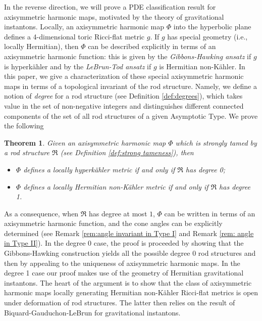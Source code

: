 \documentclass[a4paper,11pt]{amsart}
\newtheorem{theorem}{Theorem}[section]
\theoremstyle{definition}
\numberwithin{equation}{section}
\newcommand{\mR} {\mathfrak R}
\begin{document}
In the reverse direction, we will prove a PDE classification result for axisymmetric harmonic maps, motivated by the theory of gravitational instantons.     
 Locally, an axisymmetric harmonic map $\Phi$ into the hyperbolic plane defines a 4-dimensional toric Ricci-flat metric $g$. If $g$ has special geometry (i.e., locally Hermitian), then $\Phi$ can be  described explicitly in terms of an axisymmetric harmonic function: this is given by the \emph{Gibbons-Hawking ansatz} if $g$ is hyperk\"ahler and by the \emph{LeBrun-Tod ansatz} if $g$ is Hermitian non-K\"ahler. In this paper, we give a characterization of these special axisymmetric harmonic maps in terms of a topological invariant of the rod structure. Namely, we define a notion of \emph{degree} for a rod structure (see Definition \ref{def:degrees}), which takes value in the set of non-negative integers and distinguishes different connected components of the set of all rod structures of a given  Asymptotic Type. We prove the following
\begin{theorem}\label{t:main2}
    Given an axisymmetric harmonic map $\Phi$  which is strongly tamed by a rod structure $\mR$ (see  Definition \ref{def:strong tameness}), then 
    \begin{itemize}
        \item $\Phi$ defines a locally hyperk\"ahler metric if and only if $\mR$ has degree 0;
        \item $\Phi$ defines a locally Hermitian non-K\"ahler metric if and only if $\mR$ has degree 1.
    \end{itemize}
\end{theorem}

As a consequence, when $\mR$ has degree at most $1$, $\Phi$ can be written in terms of an axisymmetric harmonic function, and the cone angles can be explicitly determined (see Remark \ref{rem:angle invariant in Type I} and Remark \ref{rem: angle in Type II}). In the degree 0 case, the proof is proceeded by showing that the Gibbons-Hawking construction yields all the possible degree 0 rod structures and then by appealing to the uniqueness of axisymmetric harmonic maps. In the degree 1 case our proof makes use of the geometry of Hermitian gravitational instantons.  The heart of the argument is to show that the class of axisymmetric harmonic maps locally generating Hermitian non-K\"ahler Ricci-flat metrics is open under deformation of rod structures. The latter then relies on the result of Biquard-Gauduchon-LeBrun \cite{BGL} for gravitational instantons.
\end{document}

